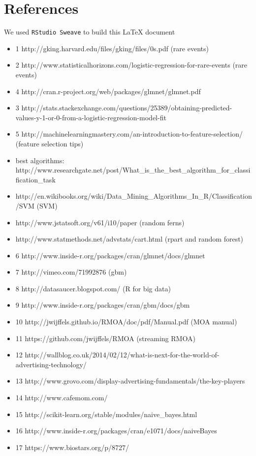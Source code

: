 \documentclass[a4paper]{article}
\begin{document}
\section*{References}
We used \texttt{RStudio Sweave} to build this \LaTeX{} document
\begin{itemize}
  \item 1 http://gking.harvard.edu/files/gking/files/0s.pdf (rare events)
  \item 2 http://www.statisticalhorizons.com/logistic-regression-for-rare-events (rare events)
  \item 4 http://cran.r-project.org/web/packages/glmnet/glmnet.pdf
  \item 3 http://stats.stackexchange.com/questions/25389/obtaining-predicted-values-y-1-or-0-from-a-logistic-regression-model-fit
  \item 5 http://machinelearningmastery.com/an-introduction-to-feature-selection/ (feature selection tips)
  \item best algorithms: http://www.researchgate.net/post/What\_is\_the\_best\_algorithm\_for\_classification\_task
  \item http://en.wikibooks.org/wiki/Data\_Mining\_Algorithms\_In\_R/Classification/SVM (SVM)
  \item http://www.jstatsoft.org/v61/i10/paper (random ferns)
  \item http://www.statmethods.net/advstats/cart.html (rpart and random forest)
  \item 6 http://www.inside-r.org/packages/cran/glmnet/docs/glmnet
  \item 7 http://vimeo.com/71992876 (gbm)
  \item 8 http://datasaucer.blogspot.com/ (R for big data)
  \item 9 http://www.inside-r.org/packages/cran/gbm/docs/gbm
  \item 10 http://jwijffels.github.io/RMOA/doc/pdf/Manual.pdf (MOA manual)
  \item 11 https://github.com/jwijffels/RMOA (streaming RMOA)
  \item 12 http://wallblog.co.uk/2014/02/12/what-is-next-for-the-world-of-advertising-technology/
  \item 13 http://www.grovo.com/display-advertising-fundamentals/the-key-players
  \item 14 http://www.cafemom.com/
  \item 15 http://scikit-learn.org/stable/modules/naive\_bayes.html
  \item 16 http://www.inside-r.org/packages/cran/e1071/docs/naiveBayes
  \item 17 https://www.biostars.org/p/8727/
\end{itemize}
\end{document}
